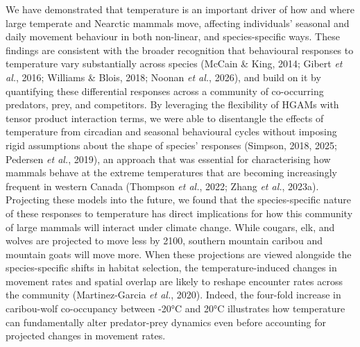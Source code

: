 \documentclass[
  12pt,
]{article}
\begin{document}
\noindent We have demonstrated that temperature is an important driver of how and where large temperate and Nearctic mammals move, affecting individuals' seasonal and daily movement behaviour in both non-linear, and species-specific ways. These findings are consistent with the broader recognition that behavioural responses to temperature vary substantially across species (McCain \& King, 2014; Gibert \emph{et al.}, 2016; Williams \& Blois, 2018; Noonan \emph{et al.}, 2026), and build on it by quantifying these differential responses across a community of co-occurring predators, prey, and competitors. By leveraging the flexibility of HGAMs with tensor product interaction terms, we were able to disentangle the effects of temperature from circadian and seasonal behavioural cycles without imposing rigid assumptions about the shape of species' responses (Simpson, 2018, 2025; Pedersen \emph{et al.}, 2019), an approach that was essential for characterising how mammals behave at the extreme temperatures that are becoming increasingly frequent in western Canada (Thompson \emph{et al.}, 2022; Zhang \emph{et al.}, 2023a). Projecting these models into the future, we found that the species-specific nature of these responses to temperature has direct implications for how this community of large mammals will interact under climate change. While cougars, elk, and wolves are projected to move less by 2100, southern mountain caribou and mountain goats will move more. When these projections are viewed alongside the species-specific shifts in habitat selection, the temperature-induced changes in movement rates and spatial overlap are likely to reshape encounter rates across the community (Martinez-Garcia \emph{et al.}, 2020). Indeed, the four-fold increase in caribou-wolf co-occupancy between -20°C and 20°C illustrates how temperature can fundamentally alter predator-prey dynamics even before accounting for projected changes in movement rates.
\end{document}

